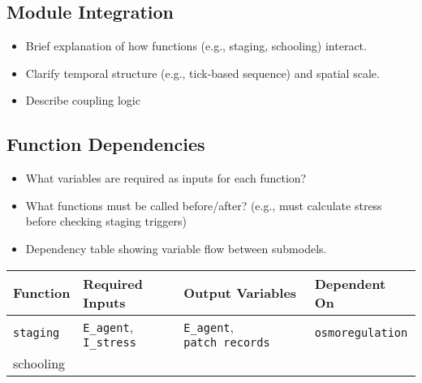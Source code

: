 \documentclass[
]{book}
\providecommand{\tightlist}{%
  \setlength{\itemsep}{0pt}\setlength{\parskip}{0pt}}
\begin{document}
\subsection{Module Integration}\label{module-integration}

\begin{itemize}
\tightlist
\item
  Brief explanation of how functions (e.g., staging, schooling) interact.
\item
  Clarify temporal structure (e.g., tick-based sequence) and spatial scale.
\item
  Describe coupling logic
\end{itemize}

\subsection{\texorpdfstring{\textbf{Function Dependencies}}{Function Dependencies}}\label{function-dependencies}

\begin{itemize}
\item
  What variables are required as inputs for each function?
\item
  What functions must be called before/after? (e.g., must calculate stress before checking staging triggers)
\item
  Dependency table showing variable flow between submodels.
\end{itemize}

\begin{longtable}[]{@{}
  >{\raggedright\arraybackslash}p{}
  >{\raggedright\arraybackslash}p{}
  >{\raggedright\arraybackslash}p{}
  >{\raggedright\arraybackslash}p{}@{}}
\toprule\noalign{}
\begin{minipage}[b]{\linewidth}\raggedright
Function
\end{minipage} & \begin{minipage}[b]{\linewidth}\raggedright
Required Inputs
\end{minipage} & \begin{minipage}[b]{\linewidth}\raggedright
Output Variables
\end{minipage} & \begin{minipage}[b]{\linewidth}\raggedright
Dependent On
\end{minipage} \\
\midrule\noalign{}
\endhead
\bottomrule\noalign{}
\endlastfoot
\texttt{staging} & \texttt{E\_agent}, \texttt{I\_stress} & \texttt{E\_agent}, \texttt{patch\ records} & \texttt{osmoregulation} \\
schooling & & & \\
\end{longtable}
\end{document}
